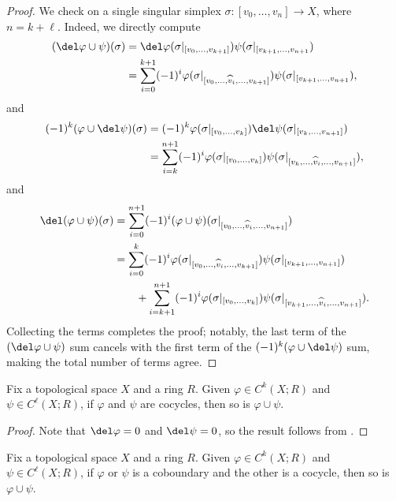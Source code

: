 \documentclass[../notes.tex]{subfiles}
\begin{document}
\begin{proof}
	We check on a single singular simplex $\sigma\colon[v_0,\ldots,v_n]\to X$, where $n=k+\ell$. Indeed, we directly compute
	\begin{align*}
		(\del\varphi\cup\psi)(\sigma) &= \del\varphi(\sigma|_{[v_0,\ldots,v_{k+1}]})\psi(\sigma|_{[v_{k+1},\ldots,v_{n+1}}) \\
		&= \sum_{i=0}^{k+1}(-1)^i\varphi(\sigma|_{[v_0,\ldots,\widehat v_i,\ldots,v_{k+1}]})\psi(\sigma|_{[v_{k+1},\ldots,v_{n+1}}),
	\end{align*}
	and
	\begin{align*}
		(-1)^k(\varphi\cup\del\psi)(\sigma) &= (-1)^k\varphi(\sigma|_{[v_0,\ldots,v_k]})\del\psi(\sigma|_{[v_k,\ldots,v_{n+1}]}) \\
		&= \sum_{i=k}^{n+1}(-1)^i\varphi(\sigma|_{[v_0,\ldots,v_k]})\psi(\sigma|_{[v_k,\ldots,\widehat v_i,\ldots,v_{n+1}]}),
	\end{align*}
	and
	\begin{align*}
		\del(\varphi\cup\psi)(\sigma) &= \sum_{i=0}^{n+1}(-1)^i(\varphi\cup\psi)(\sigma|_{[v_0,\ldots,\widehat v_i,\ldots,v_{n+1}]}) \\
		&= \sum_{i=0}^{k}(-1)^i\varphi(\sigma|_{[v_0,\ldots,\widehat v_i,\ldots,v_{k+1}]})\psi(\sigma|_{[v_{k+1},\ldots,v_{n+1}]}) \\
		&\qquad+\sum_{i=k+1}^{n+1}(-1)^i\varphi(\sigma|_{[v_0,\ldots,v_{k}]})\psi(\sigma|_{[v_{k+1},\ldots,\widehat v_i,\ldots,v_{n+1}]}).
	\end{align*}
	Collecting the terms completes the proof; notably, the last term of the $(\del\varphi\cup\psi)$ sum cancels with the first term of the $(-1)^k(\varphi\cup\del\psi)$ sum, making the total number of terms agree.
\end{proof}
\begin{corollary}
	Fix a topological space $X$ and a ring $R$. Given $\varphi\in C^k(X;R)$ and $\psi\in C^\ell(X;R)$, if $\varphi$ and $\psi$ are cocycles, then so is $\varphi\cup\psi$.
\end{corollary}
\begin{proof}
	Note that $\del\varphi=0$ and $\del\psi=0$, so the result follows from .
\end{proof}
\begin{corollary}
	Fix a topological space $X$ and a ring $R$. Given $\varphi\in C^k(X;R)$ and $\psi\in C^\ell(X;R)$, if $\varphi$ or $\psi$ is a coboundary and the other is a cocycle, then so is $\varphi\cup\psi$.
\end{corollary}
\end{document}
